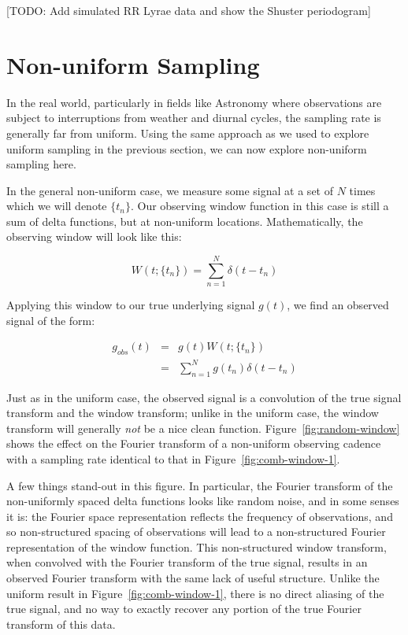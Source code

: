 \documentclass[preprint]{aastex}
\newcommand{\todo}[1]{{\color{red} [TODO: #1]}}
\newcommand{\Fig}[1]{Figure~\ref{fig:#1}}
\newcommand{\fig}[1]{Figure~\ref{fig:#1}}
\newcommand{\eqlabel}[1]{\label{eq:#1}}
\newcommand{\sectlabel}[1]{\label{sect:#1}}
\begin{document}
\todo{Add simulated RR Lyrae data and show the Shuster periodogram}


\section{Non-uniform Sampling}
\sectlabel{non-uniform-sampling}

In the real world, particularly in fields like Astronomy where observations are
subject to interruptions from weather and diurnal cycles, the sampling rate
is generally far from uniform.
Using the same approach as we used to explore uniform sampling in the previous
section, we can now explore non-uniform sampling here.

In the general non-uniform case, we measure some signal at a set of $N$ times
which we will denote $\{t_n\}$.
Our observing window function in this case is still a sum of delta functions,
but at non-uniform locations.
Mathematically, the observing window will look like this:

\begin{equation}
W(t; \{t_n\}) = \sum_{n=1}^{N} \delta(t - t_n)
\end{equation}

Applying this window to our true underlying signal $g(t)$, we find an observed
signal of the form:

\begin{eqnarray}
  g_{obs}(t) &=& g(t) W(t; \{t_n\}) \nonumber\\
             &=& \sum_{n=1}^{N} g(t_n)\delta(t - t_n)
  \eqlabel{g-nonuniform}
\end{eqnarray}

Just as in the uniform case, the observed signal is a convolution of the true
signal transform and the window transform; unlike in the uniform case, the
window transform will generally {\it not} be a nice clean function.
\Fig{random-window} shows the effect on the Fourier transform of a
non-uniform observing cadence with a sampling rate identical to that
in \fig{comb-window-1}.

A few things stand-out in this figure. In particular, the Fourier transform of
the non-uniformly spaced delta functions looks like random noise, and in some
senses it is: the Fourier space representation reflects the frequency of
observations, and so non-structured spacing of observations will lead to
a non-structured Fourier representation of the window function.
This non-structured window transform, when convolved with the Fourier transform
of the true signal, results in an observed Fourier transform with the same
lack of useful structure.
Unlike the uniform result in \Fig{comb-window-1}, there is no direct aliasing
of the true signal, and no way to exactly recover any portion of the true
Fourier transform of this data.
\end{document}

